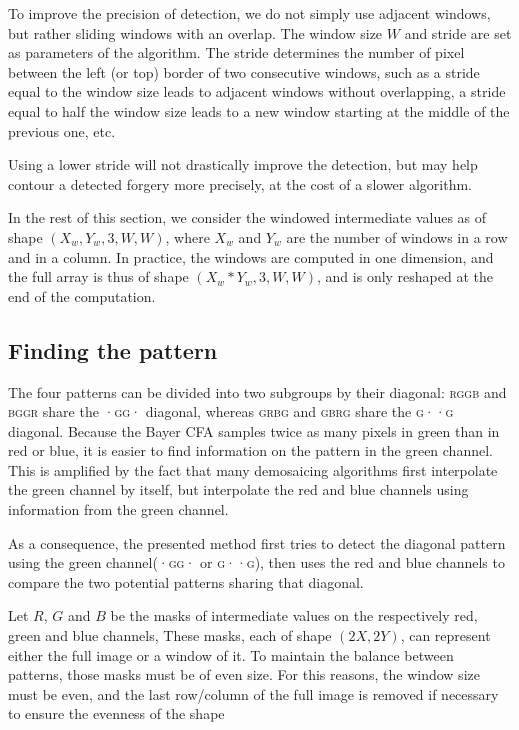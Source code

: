 \documentclass{ipol}
\begin{document}
To improve the precision of detection, we do not simply use adjacent windows, but rather sliding windows with an overlap. The window size $W$ and stride are set as parameters of the algorithm. The stride determines the number of pixel between the left (or top) border of two consecutive windows, such as a stride equal to the window size leads to adjacent windows without overlapping, a stride equal to half the window size leads to a new window starting at the middle of the previous one, etc.

Using a lower stride will not drastically improve the detection, but may help contour a detected forgery more precisely, at the cost of a slower algorithm.

In the rest of this section, we consider the windowed intermediate values as of shape $(X_w, Y_w, 3, W, W)$, where $X_w$ and $Y_w$ are the number of windows in a row and in a column. In practice, the windows are computed in one dimension, and the full array is thus of shape $(X_w*Y_w, 3, W, W)$, and is only reshaped at the end of the computation.

\subsection{Finding the pattern}
The four patterns can be divided into two subgroups by their diagonal: \textsc{rggb} and \textsc{bggr} share the \textsc{·gg·} diagonal, whereas \textsc{grbg} and \textsc{gbrg} share the \textsc{g··g} diagonal. Because the Bayer CFA samples twice as many pixels in green than in red or blue, it is easier to find information on the pattern in the green channel. This is amplified by the fact that many demosaicing algorithms first interpolate the green channel by itself, but interpolate the red and blue channels using information from the green channel.

As a consequence, the presented method first tries to detect the diagonal pattern using the green channel(\textsc{·gg·} or \textsc{g··g}), then uses the red and blue channels to compare the two potential patterns sharing that diagonal.

Let $R$, $G$ and $B$ be the masks of intermediate values on the respectively red, green and blue channels, These masks, each of shape $(2X, 2Y)$, can represent either the full image or a window of it. To maintain the balance between patterns, those masks must be of even size. For this reasons, the window size must be even, and the last row/column of the full image is removed if necessary to ensure the evenness of the shape
\end{document}
